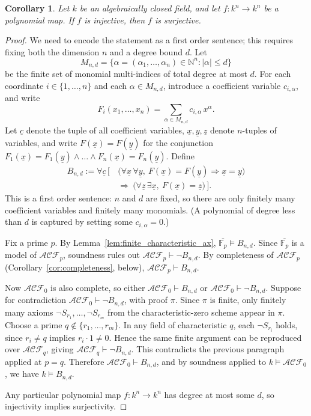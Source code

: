 \documentclass[12pt]{article}
\theoremstyle{plain}
\newtheorem{cor}[thm]{Corollary}
\theoremstyle{definition}
\newcommand{\bb}[1]{\mathbb{#1}}
\newcommand{\call}[1]{\mathcal{#1}}
\newcommand{\lto}{\longrightarrow}
\begin{document}
\begin{cor}\label{cor:transfer}
Let $k$ be an algebraically closed field, and let $f: k^n \lto k^n$ be a polynomial map. If $f$ is injective, then $f$ is surjective.
\end{cor}
\begin{proof}
We need to encode the statement as a first order sentence; this requires fixing both the dimension $n$ and a degree bound $d$. Let
\[
M_{n,d} = \big\{ \alpha = (\alpha_1,\ldots,\alpha_n) \in \bb{N}^n : |\alpha| \leq d \big\}
\]
be the finite set of monomial multi-indices of total degree at most $d$. For each coordinate $i \in \{1,\ldots,n\}$ and each $\alpha \in M_{n,d}$, introduce a coefficient variable $c_{i,\alpha}$, and write
\[
F_i(x_1,\ldots,x_n) = \sum_{\alpha \in M_{n,d}} c_{i,\alpha}\, x^\alpha.
\]
Let $\underline{c}$ denote the tuple of all coefficient variables, $\underline{x},\underline{y},\underline{z}$ denote $n$-tuples of variables, and write $F(\underline{x}) = F(\underline{y})$ for the conjunction $F_1(\underline{x}) = F_1(\underline{y}) \wedge \ldots \wedge F_n(\underline{x}) = F_n(\underline{y})$. Define
\begin{align*}
B_{n,d} := \forall \underline{c}\, \Big[\, &\big(\forall \underline{x}\,\forall \underline{y},\ F(\underline{x}) = F(\underline{y}) \Rightarrow \underline{x} = \underline{y}\big)\\
&\Rightarrow\ \big(\forall \underline{z}\,\exists \underline{x},\ F(\underline{x}) = \underline{z}\big) \,\Big].
\end{align*}
This is a first order sentence: $n$ and $d$ are fixed, so there are only finitely many coefficient variables and finitely many monomials. (A polynomial of degree less than $d$ is captured by setting some $c_{i,\alpha} = 0$.)

Fix a prime $p$. By Lemma~\ref{lem:finite_characteristic_ax}, $\overline{\bb{F}_p} \models B_{n,d}$. Since $\overline{\bb{F}_p}$ is a model of $\call{ACF}_p$, soundness rules out $\call{ACF}_p \vdash \neg B_{n,d}$. By completeness of $\call{ACF}_p$ (Corollary~\ref{cor:completeness}, below), $\call{ACF}_p \vdash B_{n,d}$.

Now $\call{ACF}_0$ is also complete, so either $\call{ACF}_0 \vdash B_{n,d}$ or $\call{ACF}_0 \vdash \neg B_{n,d}$. Suppose for contradiction $\call{ACF}_0 \vdash \neg B_{n,d}$, with proof $\pi$. Since $\pi$ is finite, only finitely many axioms $\neg S_{r_1},\ldots,\neg S_{r_m}$ from the characteristic-zero scheme appear in $\pi$. Choose a prime $q \notin \{r_1,\ldots,r_m\}$. In any field of characteristic $q$, each $\neg S_{r_i}$ holds, since $r_i \neq q$ implies $r_i \cdot 1 \neq 0$. Hence the same finite argument can be reproduced over $\call{ACF}_q$, giving $\call{ACF}_q \vdash \neg B_{n,d}$. This contradicts the previous paragraph applied at $p = q$. Therefore $\call{ACF}_0 \vdash B_{n,d}$, and by soundness applied to $k \models \call{ACF}_0$, we have $k \models B_{n,d}$.

Any particular polynomial map $f: k^n \lto k^n$ has degree at most some $d$, so injectivity implies surjectivity.
\end{proof}
\end{document}
